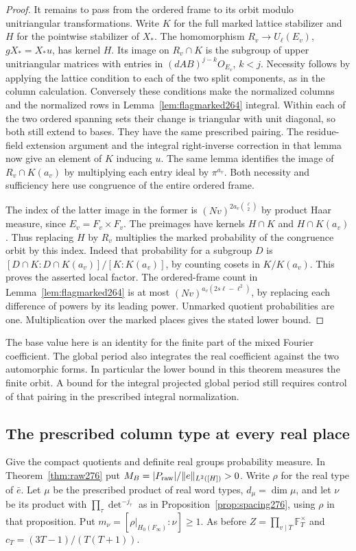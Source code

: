 \documentclass[a4paper,11pt]{article}
\theoremstyle{definition}
\theoremstyle{remark}
\numberwithin{equation}{section}
\begin{document}
\begin{proof}
It remains to pass from the ordered frame to its orbit modulo
unitriangular transformations. Write \(K\) for the full marked
lattice stabilizer and \(H\) for the pointwise stabilizer of
\(X_*\). The homomorphism \(R_v\to U_\ell(E_v)\),
\(gX_*=X_*u\), has kernel \(H\). Its image on \(R_v\cap K\)
is the subgroup of upper unitriangular matrices with entries in
\((dAB)^{j-k}O_{E_v}\), \(k<j\). Necessity follows by applying
the lattice condition to each of the two split components,
as in the column calculation. Conversely these conditions
make the normalized columns and the normalized rows in
Lemma~\ref{lem:flagmarked264} integral. Within each of the two
ordered spanning sets their change is triangular with unit
diagonal, so both still extend to bases. They have the same
prescribed pairing. The residue-field extension argument and
the integral right-inverse correction in that lemma now give
an element of \(K\) inducing \(u\). The same lemma identifies
the image of \(R_v\cap K(a_v)\) by multiplying each entry ideal
by \(\pi^{a_v}\). Both necessity and sufficiency here use
congruence of the entire ordered frame.

The index of the latter image in the former is
\((Nv)^{2a_v\binom{\ell}{2}}\) by product Haar measure, since
\(E_v=F_v\times F_v\). The preimages have kernels \(H\cap K\)
and \(H\cap K(a_v)\). Thus replacing \(H\) by \(R_v\) multiplies
the marked probability of the congruence orbit by this index.
Indeed that probability for a subgroup \(D\) is
\([D\cap K:D\cap K(a_v)]/[K:K(a_v)]\), by counting cosets
in \(K/K(a_v)\). This proves the asserted local factor.
The ordered-frame count in Lemma~\ref{lem:flagmarked264} is
at most \((Nv)^{a_v(2s\ell-\ell^2)}\), by replacing each
difference of powers by its leading power. Unmarked quotient
probabilities are one. Multiplication over the marked places
gives the stated lower bound.
\end{proof}

The base value here is an identity for the finite part of the
mixed Fourier coefficient. The global period also integrates
the real coefficient against the two automorphic forms. In
particular the lower bound in this theorem measures the finite
orbit. A bound for the integral projected global period still
requires control of that pairing in the prescribed integral
normalization.

\subsection{The prescribed column type at every real place}\label{nav:VII-48}
Give the compact quotients and definite real groups probability
measure. In Theorem~\ref{thm:raw276} put
\(M_B=|P_{\rm raw}|/\|e\|_{L^2([H])}>0\).
Write \(\rho\) for the real type of \(\bar e\).
Let \(\mu\) be the prescribed product of real word types,
\(d_\mu=\dim\mu\), and let \(\nu\) be its product with
\(\prod_\tau\det^{-j_\tau}\) as in
Proposition~\ref{prop:spacing276}, using \(\rho\) in that
proposition. Put \(m_\nu=[\rho|_{H_0(F_\infty)}:\nu]\ge1\).
As before \(Z=\prod_{v\mid T}\mathbb F_T^\times\) and
\(c_T=(3T-1)/(T(T+1))\).
\end{document}
